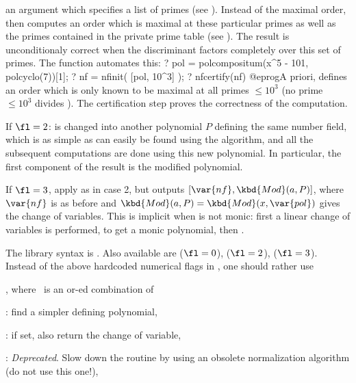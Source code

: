 \item an argument  which specifies a list of primes (see
). Instead of the maximal order,  then computes an
order which is maximal at these particular primes as well as the primes
contained in the private prime table (see ). The result is
unconditionaly correct when the discriminant  factors
completely over this set of primes. The function  automates
this:
\bprog
? pol = polcompositum(x^5 - 101, polcyclo(7))[1];
? nf = nfinit( [pol, 10^3] );
? nfcertify(nf)
@eprog\noindent A priori,  defines an order which is only known
to be maximal at all primes $\leq 10^3$ (no prime $\leq 10^3$ divides
). The certification step proves the correctness of the
computation.
\medskip

If $\fl=2$:  is changed into another polynomial $P$ defining the same
number field, which is as simple as can easily be found using the
 algorithm, and all the subsequent computations are done
using this new polynomial. In particular, the first component of the result
is the modified polynomial.

If $\fl=3$, apply  as in case 2, but outputs
$[\var{nf},\kbd{Mod}(a,P)]$, where $\var{nf}$ is as before and
$\kbd{Mod}(a,P)=\kbd{Mod}(x,\var{pol})$ gives the change of
variables. This is implicit when  is not monic: first a linear change
of variables is performed, to get a monic polynomial, then .

The library syntax is .
Also available are
 ($\fl = 0$),
 ($\fl = 2$),
 ($\fl = 3$).
Instead of the above hardcoded numerical flags in , one should
rather use

, where \fl\ is an
or-ed combination of

\item {}: find a simpler defining polynomial,

\item {}: if  set, also return the change of variable,

\item {}: \emph{Deprecated}. Slow down the routine by using an
obsolete normalization algorithm (do not use this one!),

